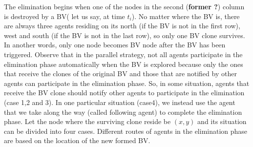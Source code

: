 The elimination begins when one of the nodes in the second ({\bf former ?}) column is destroyed by a BV( let us say, at time $t_i$). No matter where   the BV is, there are always three agents residing on its north (if the BV is not in the first row), west and south (if the BV is not in the last row), so only one BV clone survives. In another words, only one node becomes BV node after the BV has been triggered. Observe that in the parallel strategy, not all agents participate in the elimination phase automatically when the BV is explored because only the ones  that receive the clones of the original BV and those that are notified by other agents can participate in the elimination phase. So,  in some situation, agents that receive the BV clone should notify other agents to participate in the elimination (case 1,2 and 3). In one particular situation (case4), we  instead use the agent  that we take along the way (called  following agent) to complete the elimination phase. Let the node where the surviving clone reside be $(x, y)$ and its situation can be divided into four cases. Different routes of agents in the elimination phase are based on the location of the new formed BV.
